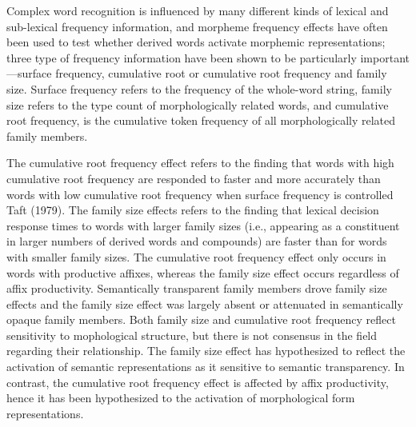 \documentclass[review]{elsarticle}
\begin{document}
Complex word recognition is influenced by many different kinds of lexical and sub-lexical frequency  information, and morpheme frequency effects have often been used to test whether derived words activate morphemic representations; three type of frequency information have been shown to be particularly important—surface frequency, cumulative root or cumulative root frequency and family size. Surface frequency refers to the frequency of the whole-word string, family size refers to the type count of morphologically related words, and cumulative root frequency, is the cumulative token frequency of all morphologically related family members. 

The cumulative root frequency effect refers to the finding that words with high cumulative root frequency are responded to faster and more accurately than words with low cumulative root frequency when surface frequency is controlled \citep{taftRecognitionAffixedWords1979}  Taft (1979).  The family size effects refers to the finding that  lexical decision response times to words with larger family sizes (i.e., appearing as a constituent in larger numbers of derived words and compounds) are faster than for words with smaller family sizes. The cumulative root frequency effect only occurs in words with productive affixes, whereas the family size effect occurs regardless of affix productivity. Semantically transparent family members drove family size effects and the family size effect was largely absent or attenuated in semantically opaque family members. Both family size and  cumulative root frequency reflect sensitivity to mophological structure, but  there is not consensus in the field regarding their relationship. 
The family size effect has hypothesized to reflect the activation of semantic representations as it sensitive to semantic transparency.  In contrast, the cumulative root frequency effect is affected by affix productivity, hence it has been hypothesized to the activation of morphological form representations.
\end{document}
